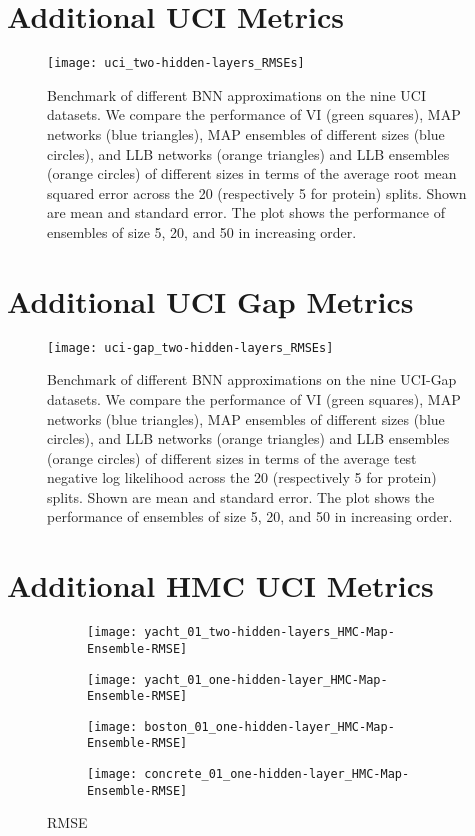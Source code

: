 \documentclass[../thesis.tex]{subfiles}
\begin{document}
\chapter{Additional UCI Metrics}
\begin{figure}
    \centering
    \texttt{[image: uci\_two-hidden-layers\_RMSEs]} 
    \caption{Benchmark of different BNN approximations on the nine UCI datasets. We compare the performance of VI (green squares), MAP networks (blue triangles), MAP ensembles of different sizes (blue circles), and LLB networks (orange triangles) and LLB ensembles (orange circles) of different sizes in terms of the average root mean squared error across the 20 (respectively 5 for protein) splits. Shown are mean and standard error. The plot shows the performance of ensembles of size 5, 20, and 50 in increasing order.}
    \label{fig:uci-benchmark-rsme}
\end{figure}


\chapter{Additional UCI Gap Metrics}
\begin{figure}
    \centering
    \texttt{[image: uci-gap\_two-hidden-layers\_RMSEs]} 
    \caption{Benchmark of different BNN approximations on the nine UCI-Gap datasets. We compare the performance of VI (green squares), MAP networks (blue triangles), MAP ensembles of different sizes (blue circles), and LLB networks (orange triangles) and LLB ensembles (orange circles) of different sizes in terms of the average test negative log likelihood across the 20 (respectively 5 for protein) splits. Shown are mean and standard error. The plot shows the performance of ensembles of size 5, 20, and 50 in increasing order.}
    \label{fig:uci-gap-benchmark-rmse}
\end{figure}


\chapter{Additional HMC UCI Metrics}
\begin{figure}
    \centering
    \begin{subfigure}{0.49\textwidth}
        \texttt{[image: yacht\_01\_two-hidden-layers\_HMC-Map-Ensemble-RMSE]} 
    \end{subfigure}
    \begin{subfigure}{0.49\textwidth}
        \texttt{[image: yacht\_01\_one-hidden-layer\_HMC-Map-Ensemble-RMSE]} 
    \end{subfigure}
    \begin{subfigure}{0.49\textwidth}
        \texttt{[image: boston\_01\_one-hidden-layer\_HMC-Map-Ensemble-RMSE]} 
    \end{subfigure}
    \begin{subfigure}{0.49\textwidth}
        \texttt{[image: concrete\_01\_one-hidden-layer\_HMC-Map-Ensemble-RMSE]} 
    \end{subfigure}
    \caption{RMSE}
    \label{fig:hmc_comparisons_two-rmse}
\end{figure}
\end{document}
